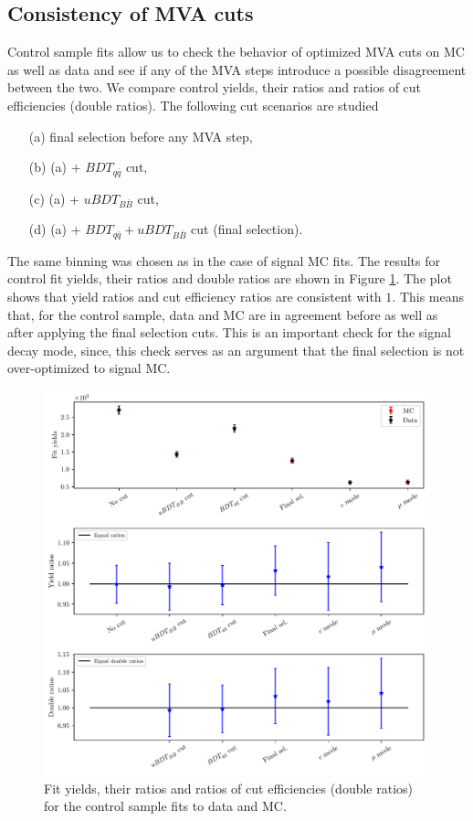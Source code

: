 \subsection{Consistency of MVA cuts}

Control sample fits allow us to check the behavior of optimized MVA cuts on MC as well as data and see if any of the MVA steps introduce a possible disagreement between the two. We compare control yields, their ratios and ratios of cut efficiencies (double ratios). The following cut scenarios are studied
\begin{itemize}
\item[(a)] final selection before any MVA step,
\item[(b)] (a) + $BDT_{q\bar q}$ cut,
\item[(c)] (a) + $uBDT_{B\bar B}$ cut,
\item[(d)] (a) + $BDT_{q\bar q} + uBDT_{B\bar B}$ cut (final selection).
\end{itemize}

The same binning was chosen as in the case of signal MC fits. The results for control fit yields, their ratios and double ratios are shown in Figure \ref{fig:cs_fits}. The plot shows that yield ratios and cut efficiency ratios are consistent with $1$. This means that, for the control sample, data and MC are in agreement before as well as after applying the final selection cuts. This is an important check for the signal decay mode, since, this check serves as an argument that the final selection is not over-optimized to signal MC.

\begin{figure}[H]
	\centering
	\captionsetup{width=0.8\linewidth}
	\includegraphics[width=\linewidth]{fig/cs_fits.pdf}
	\caption{Fit yields, their ratios and ratios of cut efficiencies (double ratios) for the control sample fits to data and MC.}
	\label{fig:cs_fits}
\end{figure}

